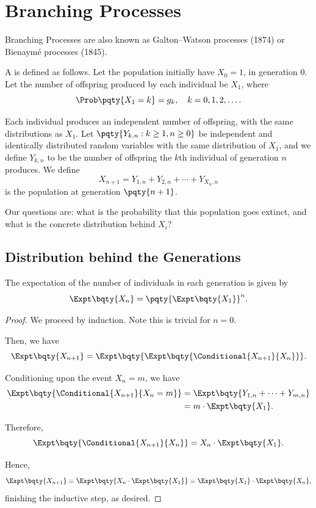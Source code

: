 \section{Branching Processes}

Branching Processes are also known as Galton--Watson processes (1874) or Bienaym\'{e} processes (1845).

\begin{definition}
    \label{def:branching-process}%
    A  is defined as follows. Let the population initially have \(X_0 = 1\), in generation \(0\). Let the number of offspring produced by each individual be \(X_1\), where
    \[
        \Prob\pqty{X_1 = k} = g_k, \quad k = 0, 1, 2, \ldots.
    \]

    Each individual produces an independent number of offspring, with the same distributions as \(X_1\). Let \(\pqty{Y_{k, n} : k \geq 1, n \geq 0}\) be independent and identically distributed random variables with the same distribution of \(X_1\), and we define \(Y_{k, n}\) to be the number of offspring the \(k\)th individual of generation \(n\) produces. We define
    \[
        X_{n + 1} = Y_{1, n} + Y_{2, n} + \cdots + Y_{X_n, n}
    \]
    is the population at generation \(\pqty{n + 1}\).
\end{definition}

Our questions are: what is the probability that this population goes extinct, and what is the concrete distribution behind \(X_i\)?

\subsection{Distribution behind the Generations}

\begin{theorem}
    \label{thm:branching-process-expt-generation}%
    The expectation of the number of individuals in each generation is given by
    \[
        \Expt\bqty{X_n} = \pqty{\Expt\bqty{X_1}}^{n}.
    \]
\end{theorem}

\begin{proof}
    We proceed by induction. Note this is trivial for \(n = 0\).

    Then, we have
    \[
        \Expt\bqty{X_{n + 1}} = \Expt\bqty{\Expt\bqty{\Conditional{X_{n + 1}}{X_n}}}.
    \]

    Conditioning upon the event \(X_n = m\), we have
    \begin{align*}
        \Expt\bqty{\Conditional{X_{n + 1}}{X_{n} = m}} &= \Expt\bqty{Y_{1, n} + \cdots + Y_{m, n}} \\
        &= m \cdot \Expt\bqty{X_1}.
    \end{align*}

    Therefore,
    \[
        \Expt\bqty{\Conditional{X_{n + 1}}{X_n}} = X_n \cdot \Expt\bqty{X_1}.
    \]

    Hence,
    \[
        \Expt\bqty{X_{n + 1}} = \Expt\bqty{X_n \cdot \Expt\bqty{X_1}} = \Expt\bqty{X_1} \cdot \Expt\bqty{X_n},
    \]
    finishing the inductive step, as desired.
\end{proof}

